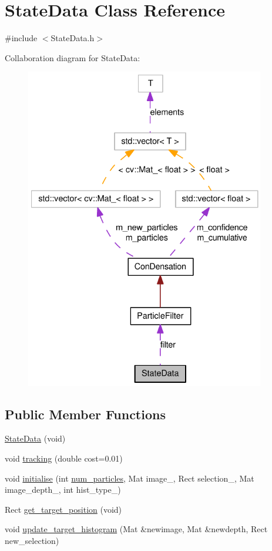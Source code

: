 \hypertarget{classStateData}{
\section{StateData Class Reference}
\label{classStateData}
}


{\ttfamily \#include $<$StateData.h$>$}



Collaboration diagram for StateData:\nopagebreak
\begin{figure}[H]
\begin{center}
\leavevmode
\includegraphics[height=400pt]{classStateData__coll__graph}
\end{center}
\end{figure}
\subsection*{Public Member Functions}
\begin{DoxyCompactItemize}
\item 
\hyperlink{classStateData_a3bbfa4301403ebf5d24d5d16cf246b88}{StateData} (void)
\item 
void \hyperlink{classStateData_af4bbe24b619137cba16b7b85970e1bd7}{tracking} (double cost=0.01)
\item 
void \hyperlink{classStateData_a3fe497a97247af50f8eb876d6284da69}{initialise} (int \hyperlink{social__robot_8cpp_acf574bc864f7f0fc111320f1d6c449d5}{num\_\-particles}, Mat image\_\-, Rect selection\_\-, Mat image\_\-depth\_\-, int hist\_\-type\_\-)
\item 
Rect \hyperlink{classStateData_aa2c20a09eecd353d4454e707ac17f143}{get\_\-target\_\-position} (void)
\item 
void \hyperlink{classStateData_a2b26ea86bd2d1d3d37debec000fefa01}{update\_\-target\_\-histogram} (Mat \&newimage, Mat \&newdepth, Rect new\_\-selection)
\end{DoxyCompactItemize}
